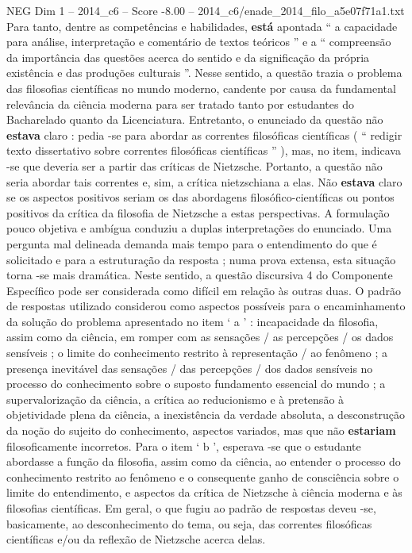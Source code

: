 \begin{textsample}{NEG Dim 1 – 2014\_c6 – Score -8.00 – 2014\_c6/enade\_2014\_filo\_a5e07f71a1.txt}
Para tanto, dentre as competências e habilidades, \textbf{está} apontada “ a capacidade para análise, interpretação e comentário de textos teóricos ” e a “ compreensão da importância das questões acerca do sentido e da significação da própria existência e das produções culturais ”.
Nesse sentido, a questão trazia o problema das filosofias científicas no mundo moderno, candente por causa da fundamental relevância da ciência moderna para ser tratado tanto por estudantes do Bacharelado quanto da Licenciatura.
Entretanto, o enunciado da questão não \textbf{estava} claro : pedia -se para abordar as correntes filosóficas científicas ( “ redigir texto dissertativo sobre correntes filosóficas científicas ” ), mas, no item, indicava -se que deveria ser a partir das críticas de Nietzsche.
Portanto, a questão não seria abordar tais correntes e, sim, a crítica nietzschiana a elas.
Não \textbf{estava} claro se os aspectos positivos seriam os das abordagens filosófico-científicas ou pontos positivos da crítica da filosofia de Nietzsche a estas perspectivas.
A formulação pouco objetiva e ambígua conduziu a duplas interpretações do enunciado.
Uma pergunta mal delineada demanda mais tempo para o entendimento do que é solicitado e para a estruturação da resposta ; numa prova extensa, esta situação torna -se mais dramática.
Neste sentido, a questão discursiva 4 do Componente Específico pode ser considerada como difícil em relação às outras duas.
O padrão de respostas utilizado considerou como aspectos possíveis para o encaminhamento da solução do problema apresentado no item ‘ a ’ : incapacidade da filosofia, assim como da ciência, em romper com as sensações / as percepções / os dados sensíveis ; o limite do conhecimento restrito à representação / ao fenômeno ; a presença inevitável das sensações / das percepções / dos dados sensíveis no processo do conhecimento sobre o suposto fundamento essencial do mundo ; a supervalorização da ciência, a crítica ao reducionismo e à pretensão à objetividade plena da ciência, a inexistência da verdade absoluta, a desconstrução da noção do sujeito do conhecimento, aspectos variados, mas que não \textbf{estariam} filosoficamente incorretos.
Para o item ‘ b ’, esperava -se que o estudante abordasse a função da filosofia, assim como da ciência, ao entender o processo do conhecimento restrito ao fenômeno e o consequente ganho de consciência sobre o limite do entendimento, e aspectos da crítica de Nietzsche à ciência moderna e às filosofias científicas.
Em geral, o que fugiu ao padrão de respostas deveu -se, basicamente, ao desconhecimento do tema, ou seja, das correntes filosóficas científicas e/ou da reflexão de Nietzsche acerca delas.

\end{textsample}
